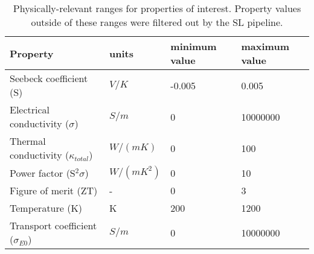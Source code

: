 \begin{table}
\centering
\caption{Physically-relevant ranges for properties of interest. Property values outside of these ranges were filtered out by the SL pipeline.}
\label{table:prop_ranges}
\begin{tabular}{llll}
\toprule
                               Property &      units & minimum value & maximum value \\
\midrule
                Seebeck coefficient (S) &      $V/K$ &        -0.005 &         0.005 \\
     Electrical conductivity ($\sigma$) &      $S/m$ &             0 &      10000000 \\
Thermal conductivity ($\kappa_{total}$) &   $W/(mK)$ &             0 &           100 \\
             Power factor (S$^2\sigma$) & $W/(mK^2)$ &             0 &            10 \\
                   Figure of merit (ZT) &          - &             0 &             3 \\
                        Temperature (K) &          K &           200 &          1200 \\
  Transport coefficient ($\sigma_{E0}$) &      $S/m$ &             0 &      10000000 \\
\bottomrule
\end{tabular}
\end{table}
